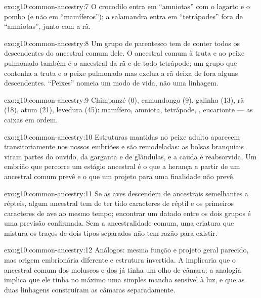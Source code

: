 \begin{solution}{exo:g10:common-ancestry:7}
O crocodilo entra em ``amniotas'' com o lagarto e o pombo (e não em
``mamíferos''); a salamandra entra em ``tetrápodes'' fora de
``amniotas'', junto com a rã.
\end{solution}

\begin{solution}{exo:g10:common-ancestry:8}
Um grupo de parentesco tem de conter todos os descendentes do ancestral
comum dele. O ancestral comum à truta e ao peixe pulmonado também é o
ancestral da rã e de todo tetrápode; um grupo que contenha a truta e o
peixe pulmonado mas exclua a rã deixa de fora alguns descendentes.
``Peixes'' nomeia um modo de vida, não uma linhagem.
\end{solution}

\begin{solution}{exo:g10:common-ancestry:9}
Chimpanzé (0), camundongo (9), galinha (13), rã (18), atum (21),
levedura (45): mamífero, amniota, tetrápode, , eucarionte ---
as caixas em ordem.
\end{solution}

\begin{solution}{exo:g10:common-ancestry:10}
Estruturas mantidas no peixe adulto aparecem transitoriamente nos
nossos embriões e são remodeladas: as bolsas branquiais viram partes do
ouvido, da garganta e de glândulas, e a cauda é reabsorvida. Um embrião
que percorre um estágio ancestral é o que a herança a partir de um
ancestral comum prevê e o que um projeto para uma finalidade não prevê.
\end{solution}

\begin{solution}{exo:g10:common-ancestry:11}
Se as aves descendem de ancestrais semelhantes a répteis, algum
ancestral tem de ter tido caracteres de réptil e os primeiros
caracteres de ave ao mesmo tempo; encontrar um datado entre os dois
grupos é uma previsão confirmada. Sem a ancestralidade comum, uma
criatura que mistura os traços de dois tipos separados não tem razão
para existir.
\end{solution}

\begin{solution}{exo:g10:common-ancestry:12}
Análogos: mesma função e projeto geral parecido, mas origem embrionária
diferente e estrutura invertida. A  implicaria que o ancestral
comum dos moluscos e dos  já tinha um olho de câmara; a
analogia implica que ele tinha no máximo uma simples mancha sensível à
luz, e que as duas linhagens construíram as câmaras separadamente.
\end{solution}

